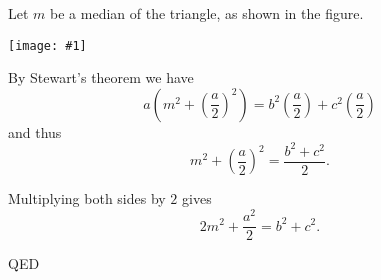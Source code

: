 \documentclass[12pt]{article}
\newcommand{\figura}[1]{\begin{center}\texttt{[image: \#1]}\end{center}}
\begin{document}
 Let $m$ be a median of the triangle, as shown in the figure.
\figura{apollonius}

By Stewart's theorem we have
$$a\left(m^2+ \left(\frac{a}{2}\right)^2 \right)=b^2\left(\frac{a}{2}\right)+c^2\left(\frac{a}{2}\right)$$
and thus
$$m^2+\left(\frac{a}{2}\right)^2=\frac{b^2+c^2}{2}.$$

Multiplying both sides by $2$ gives
$$2m^2+\frac{a^2}{2}=b^2+c^2.$$

QED
\end{document}
